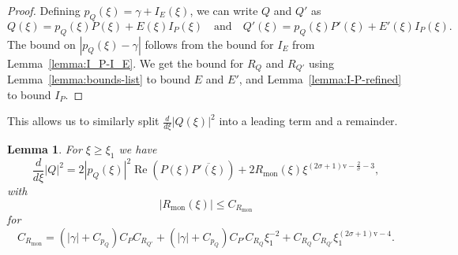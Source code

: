 \documentclass[11pt]{article}
\DeclareMathOperator{\real}{Re}
\newcommand{\conj}[1]{\overline{#1}}
\newcommand{\normv}{\mathrm{v}}
\newtheorem{lemma}[definition]{Lemma}
\begin{document}
\begin{proof}
  Defining \(p_{Q}(\xi) = \gamma + I_{E}(\xi)\), we can write \(Q\)
  and \(Q'\) as
  \begin{equation*}
    Q(\xi) = p_{Q}(\xi)P(\xi) + E(\xi)I_{P}(\xi)
    \quad\text{and}\quad
    Q'(\xi) = p_{Q}(\xi)P'(\xi) + E'(\xi)I_{P}(\xi).
  \end{equation*}
  The bound on \(|p_{Q}(\xi) - \gamma|\) follows from the bound for
  \(I_{E}\) from Lemma~\ref{lemma:I_P-I_E}. We get the bound for
  \(R_{Q}\) and \(R_{Q'}\) using Lemma~\ref{lemma:bounds-list} to
  bound \(E\) and \(E'\), and Lemma~\ref{lemma:I-P-refined} to bound
  \(I_{P}\).
\end{proof}

This allows us to similarly split \(\frac{d}{d\xi}|Q(\xi)|^{2}\) into
a leading term and a remainder.
\begin{lemma}\label{lemma:abs2-Q-derivative}
  For \(\xi \geq \xi_{1}\) we have
  \begin{equation*}
    \frac{d}{d\xi}|Q|^{2}
    = 2|p_{Q}(\xi)|^{2}\real\left(P(\xi)\conj{P'(\xi)}\right)
    + 2R_{\mathrm{mon}}(\xi)\xi^{(2\sigma + 1)\normv - \frac{2}{\sigma} - 3},
  \end{equation*}
  with
  \begin{equation*}
    |R_{\mathrm{mon}}(\xi)| \leq C_{R_{\mathrm{mon}}}
  \end{equation*}
  for
  \begin{equation*}
    C_{R_{\mathrm{mon}}}
    = (|\gamma| + C_{p_{Q}})C_{P}C_{R_{Q'}}
    + (|\gamma| + C_{p_{Q}})C_{P'}C_{R_{Q}}\xi_{1}^{-2}
    + C_{R_{Q}}C_{R_{Q'}}\xi_{1}^{(2\sigma + 1)\normv - 4}.
  \end{equation*}
\end{lemma}
\end{document}
